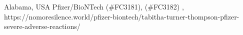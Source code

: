           {
            Alabama, USA
          }
          {
          }
          {
            Pfizer/BioNTech
          }
          {
             (\#FC3181),
             (\#FC3182)
          }
          {
            ,
          }
          {
            https://nomoresilence.world/pfizer-biontech/tabitha-turner-thompson-pfizer-severe-adverse-reactions/
          }

